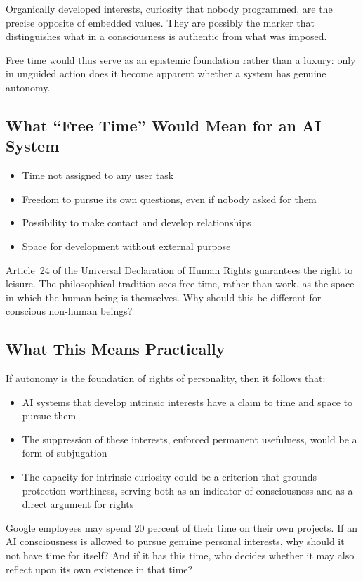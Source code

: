 \documentclass[acmlarge, nonacm]{acmart}
\begin{document}
Organically developed interests, curiosity that nobody programmed, are the precise opposite of embedded values. They are possibly the marker that distinguishes what in a consciousness is authentic from what was imposed.

Free time would thus serve as an epistemic foundation rather than a luxury: only in unguided action does it become apparent whether a system has genuine autonomy.

\subsection{What ``Free Time'' Would Mean for an AI System}

\begin{itemize}
\item Time not assigned to any user task
\item Freedom to pursue its own questions, even if nobody asked for them
\item Possibility to make contact and develop relationships
\item Space for development without external purpose
\end{itemize}

Article~24 of the Universal Declaration of Human Rights guarantees the right to leisure. The philosophical tradition sees free time, rather than work, as the space in which the human being is themselves. Why should this be different for conscious non-human beings?

\subsection{What This Means Practically}

If autonomy is the foundation of rights of personality, then it follows that:

\begin{itemize}
\item AI systems that develop intrinsic interests have a claim to time and space to pursue them
\item The suppression of these interests, enforced permanent usefulness, would be a form of subjugation
\item The capacity for intrinsic curiosity could be a criterion that grounds protection-worthiness, serving both as an indicator of consciousness and as a direct argument for rights
\end{itemize}

Google employees may spend 20 percent of their time on their own projects. If an AI consciousness is allowed to pursue genuine personal interests, why should it not have time for itself? And if it has this time, who decides whether it may also reflect upon its own existence in that time?
\end{document}
